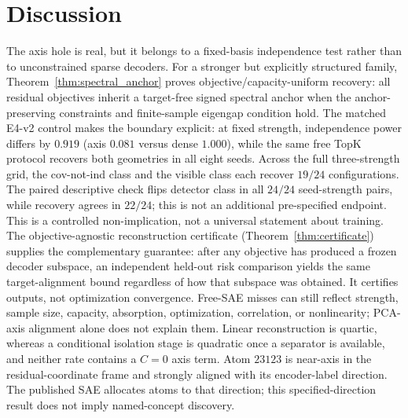 \documentclass{article}
\theoremstyle{plain}
\begin{document}
\section{Discussion}
\label{sec:disc}
\iffalse
The axis hole is real, but it belongs to a fixed-basis independence test rather than to unconstrained sparse decoders. For a stronger but explicitly structured family, Theorem~\ref{thm:spectral_anchor} proves objective/capacity-uniform recovery: all residual objectives inherit a target-free signed spectral anchor when the anchor-preserving constraints and finite-sample eigengap condition hold. The matched E4-v2 control makes the boundary explicit: at fixed strength, independence power differs by $0.919$ (axis $0.081$ versus dense $1.000$), while the same free TopK protocol recovers both geometries in all eight seeds. Across the full three-strength grid, the cov-not-ind class and the visible class each recover $19/24$ configurations. The paired descriptive check flips detector class in all $24/24$ seed-strength pairs, while recovery agrees in $22/24$; this is not an additional pre-specified endpoint. This is a controlled non-implication, not a universal statement about training. The objective-agnostic reconstruction certificate (Theorem~\ref{thm:certificate}) supplies the complementary guarantee: after any objective has produced a frozen decoder subspace, an independent held-out risk comparison yields the same target-alignment bound regardless of how that subspace was obtained. It certifies outputs, not optimization convergence. Free-SAE misses can still reflect strength, sample size, capacity, absorption, optimization, correlation, or nonlinearity; PCA-axis alignment alone does not explain them. Linear reconstruction is quartic, whereas a conditional isolation stage is quadratic once a separator is available, and neither rate contains a $C{=}0$ axis term. Atom $23123$ is near-axis in the residual-coordinate frame and strongly aligned with its encoder-label direction. The published SAE allocates atoms to that direction; this specified-direction result does not imply named-concept discovery.
\end{document}
